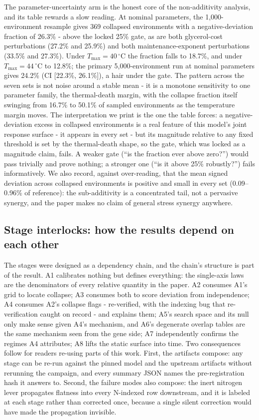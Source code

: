\documentclass[12pt]{article}
\begin{document}
The parameter-uncertainty arm is the honest core of the
non-additivity analysis, and its table rewards a slow reading. At
nominal parameters, the 1{,}000-environment resample gives 369
collapsed environments with a negative-deviation fraction of 26.3\% -
above the locked 25\% gate, as are both glycerol-cost perturbations
(27.2\% and 25.9\%) and both maintenance-exponent perturbations
(33.5\% and 27.3\%). Under $T_{\max}=40\,^{\circ}$C the fraction
falls to 18.7\%, and under $T_{\max}=44\,^{\circ}$C to 12.8\%; the
primary 5{,}000-environment run at nominal parameters gives 24.2\%
(CI [22.3\%, 26.1\%]), a hair under the gate. The pattern across the
seven sets is not noise around a stable mean - it is a monotone
sensitivity to one parameter family, the thermal-death margin, with
the collapse fraction itself swinging from 16.7\% to 50.1\% of
sampled environments as the temperature margin moves. The
interpretation we print is the one the table forces: a
negative-deviation excess in collapsed environments is a real feature
of this model's joint response surface - it appears in every set -
but its magnitude relative to any fixed threshold is set by the
thermal-death shape, so the gate, which was locked as a magnitude
claim, fails. A weaker gate (``is the fraction ever above zero?'')
would pass trivially and prove nothing; a stronger one (``is it above
25\% robustly?'') fails informatively. We also record, against
over-reading, that the mean signed deviation across collapsed
environments is positive and small in every set (0.09--0.96\% of
reference): the sub-additivity is a concentrated tail, not a
pervasive synergy, and the paper makes no claim of general
stress synergy anywhere.

\subsection{Stage interlocks: how the results depend on each other}

The stages were designed as a dependency chain, and the chain's
structure is part of the result. A1 calibrates nothing but defines
everything: the single-axis laws are the denominators of every
relative quantity in the paper. A2 consumes A1's grid to locate
collapse; A3 consumes both to score deviation from independence; A4
consumes A2's collapse flags - re-verified, with the indexing bug
that re-verification caught on record - and explains them; A5's
search space and its null only make sense given A4's mechanism, and
A6's degenerate overlap tables are the same mechanism seen from the
gene side; A7 independently confirms the regimes A4 attributes; A8
lifts the static surface into time. Two consequences follow for
readers re-using parts of this work. First, the artifacts compose:
any stage can be re-run against the pinned model and the upstream
artifacts without rerunning the campaign, and every summary JSON
names the pre-registration hash it answers to. Second, the failure
modes also compose: the inert nitrogen lever propagates flatness into
every N-indexed row downstream, and it is labeled at each stage
rather than corrected once, because a single silent correction would
have made the propagation invisible.
\end{document}
